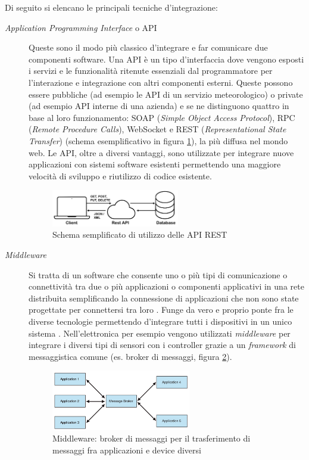 Di seguito si elencano le principali tecniche d'integrazione:

\begin{description}
    \item [\textit{Application Programming Interface} o API] {Queste sono il modo più classico d'integrare e far comunicare due componenti software. Una API è un tipo d'interfaccia dove vengono esposti i servizi e le funzionalità ritenute essenziali dal programmatore per l'interazione e integrazione con altri componenti esterni.
    Queste possono essere pubbliche (ad esempio le API di un servizio meteorologico) o private (ad esempio API interne di una azienda) e se ne distinguono quattro in base al loro funzionamento: SOAP (\textit{Simple Object Access Protocol}), RPC (\textit{Remote Procedure Calls}), WebSocket e REST (\textit{Representational State Transfer}) (schema esemplificativo in figura \ref{fig:restAPIschema}), la più diffusa nel mondo web.
    Le API, oltre a diversi vantaggi, sono utilizzate per integrare nuove applicazioni con sistemi software esistenti permettendo una maggiore velocità di sviluppo e riutilizzo di codice esistente.}

    \begin{figure} 
        \centering
        \includegraphics[width=0.55\textwidth]{img/api-firebase.png}
        \caption{Schema semplificato di utilizzo delle API REST}
        \label{fig:restAPIschema}
    \end{figure}
    
    \item [\textit{Middleware}] Si tratta di un software che consente uno o più tipi di comunicazione o connettività tra due o più applicazioni o componenti applicativi in una rete distribuita semplificando la connessione di applicazioni che non sono state progettate per connettersi tra loro \cite{ibm_middleware}. Funge da vero e proprio ponte fra le diverse tecnologie permettendo d'integrare tutti i dispositivi in un unico sistema \cite{aws}. Nell'elettronica per esempio vengono utilizzati \textit{middleware} per integrare i diversi tipi di sensori con i controller grazie a un \textit{framework} di messaggistica comune (es. broker di messaggi, figura \ref{fig:broker}).
 
    \begin{figure} 
        \centering
        \includegraphics[width=0.6\textwidth]{img/message-broker.png}
        \caption{Middleware: broker di messaggi per il trasferimento di messaggi fra applicazioni e device diversi}
        \label{fig:broker}
    \end{figure}


\end{description}
